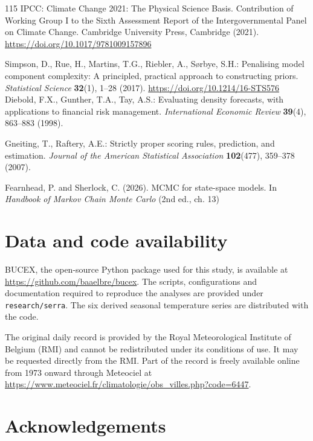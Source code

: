 \documentclass[11pt,a4paper]{article}
\begin{document}
\begin{thebibliography}{115}
		IPCC:
		Climate Change 2021: The Physical Science Basis.
		Contribution of Working Group I to the Sixth Assessment Report of the
		Intergovernmental Panel on Climate Change.
		Cambridge University Press, Cambridge (2021).
		\url{https://doi.org/10.1017/9781009157896}
		
		Simpson, D., Rue, H., Martins, T.G., Riebler, A., Sørbye, S.H.:
		Penalising model component complexity: A principled, practical approach
		to constructing priors.
		\textit{Statistical Science} \textbf{32}(1), 1--28 (2017).
		\url{https://doi.org/10.1214/16-STS576}
		Diebold, F.X., Gunther, T.A., Tay, A.S.:
		Evaluating density forecasts, with applications to financial risk management.
		\textit{International Economic Review} \textbf{39}(4), 863--883 (1998).
		
		Gneiting, T., Raftery, A.E.:
		Strictly proper scoring rules, prediction, and estimation.
		\textit{Journal of the American Statistical Association}
		\textbf{102}(477), 359--378 (2007).
		
		 Fearnhead, P. and Sherlock, C. (2026). MCMC for state-space models. In \emph{Handbook of Markov Chain Monte Carlo} (2nd ed., ch. 13)
		
	\end{thebibliography}
	
	
	\section*{Data and code availability}
	
	BUCEX, the open-source Python package used for this study, is available at \url{https://github.com/baaelbre/bucex}. The scripts, configurations and documentation required to reproduce the analyses are provided under \texttt{research/serra}. The six derived seasonal temperature series are distributed with the code.
	
	The original daily record is provided by the Royal Meteorological Institute of Belgium (RMI) and cannot be redistributed under its conditions of use. It may be requested directly from the RMI. Part of the record is freely available online from 1973 onward through Meteociel at \url{https://www.meteociel.fr/climatologie/obs_villes.php?code=6447}.
	
	
	\section*{Acknowledgements}
	
\end{document}
